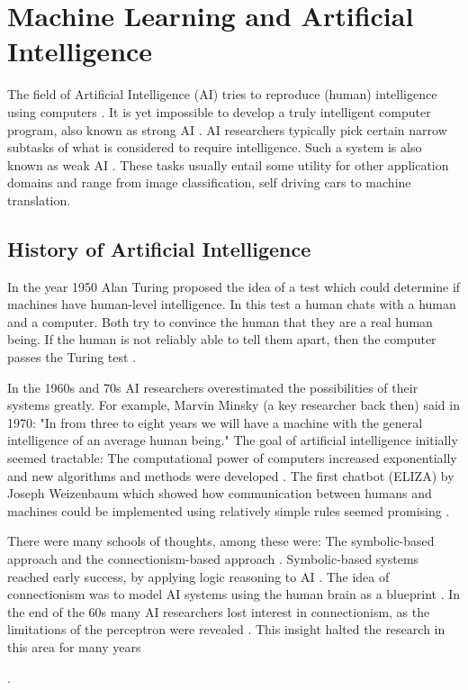 \documentclass[draft,final,oneside]{vutinfth} %
\begin{document}
\section{Machine Learning and Artificial Intelligence}
The field of Artificial Intelligence (AI) tries to reproduce (human) intelligence using computers \cite{questforai}. It is yet impossible to develop a truly intelligent computer program, also known as strong AI \cite{strongweakai}. AI researchers typically pick certain narrow subtasks of what is considered to require intelligence. Such a system is also known as weak AI \cite{strongweakai}. These tasks usually entail some utility for other application domains and range from image classification, self driving cars to machine translation.

\subsection{History of Artificial Intelligence}

In the year 1950 Alan Turing proposed the idea of a test which could determine if machines have human-level intelligence. In this test a human chats with a human and a computer. Both try to convince the human that they are a real human being. If the human is not reliably able to tell them apart, then the computer passes the Turing test \cite{turingtest}.

In the 1960s and 70s AI researchers overestimated the possibilities of their systems greatly. For example, Marvin Minsky (a key researcher back then) said in 1970: "In from three to eight years we will have a machine with the general intelligence of an average human being." The goal of artificial intelligence initially seemed tractable:
The computational power of computers increased exponentially and new algorithms and methods were developed \cite{mooreslaw}\cite{questforai}. The first chatbot (ELIZA) by Joseph Weizenbaum which showed how communication between humans and machines could be implemented using relatively simple rules seemed promising \cite{weizenbaum1966eliza}.

There were many schools of thoughts, among these were: The symbolic-based approach and the connectionism-based approach \cite{machineswhothink}. Symbolic-based systems reached early success, by applying logic reasoning to AI \cite{machineswhothink}. The idea of connectionism was to model AI systems using the human brain as a blueprint \cite{machineswhothink}. In the end of the 60s many AI researchers lost interest in connectionism, as the limitations of the perceptron were revealed \cite{Minsky1969PerceptronsA}. This insight halted the research in this area for many years \begin{flushleft}
\cite{questforai}
\end{flushleft}.
\end{document}
